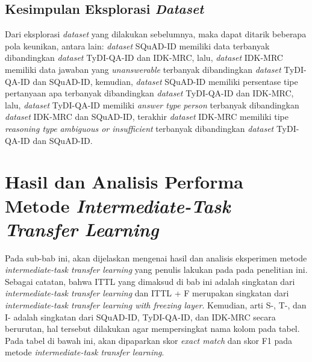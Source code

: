 \subsection{Kesimpulan Eksplorasi \emph{Dataset}}
Dari eksplorasi \emph{dataset} yang dilakukan sebelumnya, maka dapat ditarik beberapa pola keunikan, antara lain: \emph{dataset} SQuAD-ID memiliki data terbanyak dibandingkan \emph{dataset} TyDI-QA-ID dan IDK-MRC, lalu, \emph{dataset} IDK-MRC memiliki data jawaban yang \emph{unanswerable} terbanyak dibandingkan \emph{dataset} TyDI-QA-ID dan SQuAD-ID, kemudian, \emph{dataset} SQuAD-ID memiliki persentase tipe pertanyaan apa terbanyak dibandingkan \emph{dataset} TyDI-QA-ID dan IDK-MRC, lalu, \emph{dataset} TyDI-QA-ID memiliki \emph{answer type} \emph{person} terbanyak dibandingkan \emph{dataset} IDK-MRC dan SQuAD-ID, terakhir \emph{dataset} IDK-MRC memiliki tipe \emph{reasoning type} \emph{ambiguous or insufficient} terbanyak dibandingkan \emph{dataset} TyDI-QA-ID dan SQuAD-ID.

\section{Hasil dan Analisis Performa Metode \emph{Intermediate-Task Transfer Learning}}
\label{5.2}
Pada sub-bab ini, akan dijelaskan mengenai hasil dan analisis eksperimen metode \emph{intermediate-task transfer learning} yang penulis lakukan pada pada penelitian ini. Sebagai catatan, bahwa ITTL yang dimaksud di bab ini adalah singkatan dari \emph{intermediate-task transfer learning} dan ITTL + F merupakan singkatan dari \emph{intermediate-task transfer learning with freezing layer}. Kemudian, arti S-, T-, dan I- adalah singkatan dari SQuAD-ID, TyDI-QA-ID, dan IDK-MRC secara berurutan, hal tersebut dilakukan agar mempersingkat nama kolom pada tabel. Pada tabel di bawah ini, akan dipaparkan skor \emph{exact match} dan skor F1 pada metode \emph{intermediate-task transfer learning}.

